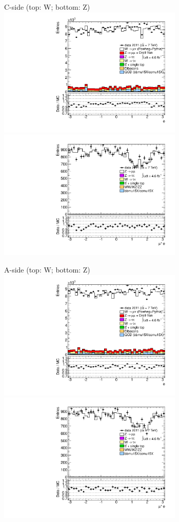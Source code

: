 {

\colb[T]

C-side (top: W; bottom: Z)
\centering
\includegraphics[width=0.66\textwidth]{dates/20130306/figures/etaphi/W_7_C_stack_l_phi_POS} \\
\includegraphics[width=0.66\textwidth]{dates/20130306/figures/etaphi/Z_7_C_stack_lP_phi_ALL.pdf}

A-side (top: W; bottom: Z)
\centering
\includegraphics[width=0.66\textwidth]{dates/20130306/figures/etaphi/W_7_A_stack_l_phi_POS} \\
\includegraphics[width=0.66\textwidth]{dates/20130306/figures/etaphi/Z_7_A_stack_lP_phi_ALL.pdf} 

\cole
}


